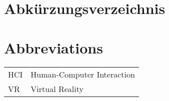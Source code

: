 \ifhcilanguagegerman
\section*{Abkürzungsverzeichnis}
\else
\section*{Abbreviations}
\fi

\begin{table}[h]		
	\begin{tabular}{ll}
		HCI & Human-Computer Interaction \\
		VR & Virtual Reality \\			
	\end{tabular}
\end{table}

